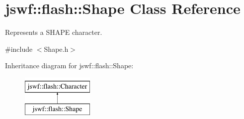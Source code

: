 \hypertarget{classjswf_1_1flash_1_1_shape}{\section{jswf\+:\+:flash\+:\+:Shape Class Reference}
\label{classjswf_1_1flash_1_1_shape}
}


Represents a {\ttfamily S\+H\+A\+P\+E} character.  




{\ttfamily \#include $<$Shape.\+h$>$}

Inheritance diagram for jswf\+:\+:flash\+:\+:Shape\+:\begin{figure}[H]
\begin{center}
\leavevmode
\includegraphics[height=2.000000cm]{classjswf_1_1flash_1_1_shape}
\end{center}
\end{figure}
